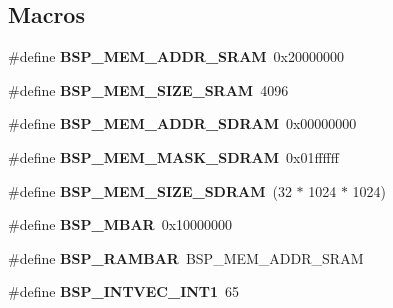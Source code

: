 \subsection*{Macros}
\begin{DoxyCompactItemize}
\item 
\mbox{\label{group__RTEMSBSPsM68kCSB3602_gae4a23eb7420382ac7d88760df18f7c30}} 
\#define {\bfseries B\+S\+P\+\_\+\+M\+E\+M\+\_\+\+A\+D\+D\+R\+\_\+\+S\+R\+AM}~0x20000000
\item 
\mbox{\label{group__RTEMSBSPsM68kCSB3602_ga31984cf2cc448852b70d084959e63958}} 
\#define {\bfseries B\+S\+P\+\_\+\+M\+E\+M\+\_\+\+S\+I\+Z\+E\+\_\+\+S\+R\+AM}~4096
\item 
\mbox{\label{group__RTEMSBSPsM68kCSB3602_gafac4f03d1f04e728516f7b4d648eee63}} 
\#define {\bfseries B\+S\+P\+\_\+\+M\+E\+M\+\_\+\+A\+D\+D\+R\+\_\+\+S\+D\+R\+AM}~0x00000000
\item 
\mbox{\label{group__RTEMSBSPsM68kCSB3602_ga57aeef430a0360bf446faa5f2309839b}} 
\#define {\bfseries B\+S\+P\+\_\+\+M\+E\+M\+\_\+\+M\+A\+S\+K\+\_\+\+S\+D\+R\+AM}~0x01ffffff
\item 
\mbox{\label{group__RTEMSBSPsM68kCSB3602_ga9693384e5757b0891f3c254a1836d0d8}} 
\#define {\bfseries B\+S\+P\+\_\+\+M\+E\+M\+\_\+\+S\+I\+Z\+E\+\_\+\+S\+D\+R\+AM}~(32 $\ast$ 1024 $\ast$ 1024)
\item 
\mbox{\label{group__RTEMSBSPsM68kCSB3602_gaa65045a04d668c0a2f755a4f91b02ab0}} 
\#define {\bfseries B\+S\+P\+\_\+\+M\+B\+AR}~0x10000000
\item 
\mbox{\label{group__RTEMSBSPsM68kCSB3602_ga70e01c9c4e2f63abd6f149e6f91166cc}} 
\#define {\bfseries B\+S\+P\+\_\+\+R\+A\+M\+B\+AR}~B\+S\+P\+\_\+\+M\+E\+M\+\_\+\+A\+D\+D\+R\+\_\+\+S\+R\+AM
\item 
\mbox{\label{group__RTEMSBSPsM68kCSB3602_ga63fb0d1684d570819805e01f90ab590b}} 
\#define {\bfseries B\+S\+P\+\_\+\+I\+N\+T\+V\+E\+C\+\_\+\+I\+N\+T1}~65
\item 

\end{DoxyCompactItemize}
